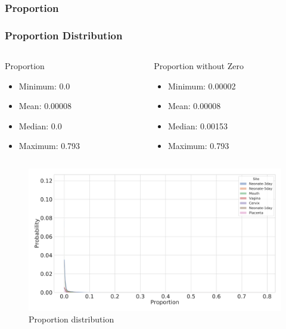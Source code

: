 \documentclass{beamer}
\begin{document}
    \subsubsection{Proportion}
    \begin{frame}
        \frametitle{Proportion Distribution}

        \begin{columns}
            \begin{column}{0.4 \linewidth}
                \begin{block}{Proportion}
                    \begin{itemize}
                        \item Minimum: 0.0
                        \item Mean: 0.00008
                        \item Median: 0.0
                        \item Maximum: 0.793
                    \end{itemize}
                \end{block}
            \end{column}

            \begin{column}{0.4 \linewidth}
                \begin{block}{Proportion without Zero}
                    \begin{itemize}
                        \item Minimum: 0.00002
                        \item Mean: 0.00008
                        \item Median: 0.00153
                        \item Maximum: 0.793
                    \end{itemize}
                \end{block}
            \end{column}
        \end{columns}

        \begin{figure}
            \includegraphics[width=0.5 \linewidth]{figures/Step53_Proportion/everything.DADA2.homd.uncorrected.pdf}
            \caption{Proportion distribution}
        \end{figure}
    \end{frame}
\end{document}
